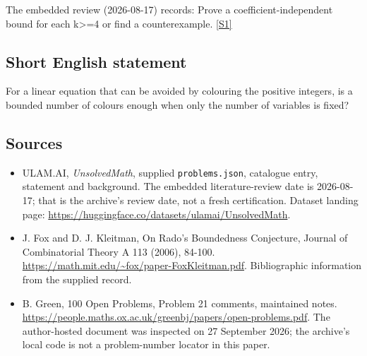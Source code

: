 \documentclass[11pt,a4paper]{article}
\newcommand{\sref}[2]{\hyperlink{source:#1:#2}{[S#2]}}
\begin{document}
The embedded review (2026-08-17) records: Prove a coefficient-independent bound for each k>=4 or find a counterexample. \sref{statement}{1}

\subsection{Short English statement}

For a linear equation that can be avoided by colouring the positive integers, is a bounded number of colours enough when only the number of variables is fixed?

\subsection{Sources}

{\small

\begin{itemize}

\item[\hypertarget{source:statement:1}{S1}] ULAM.AI, \emph{UnsolvedMath}, supplied \texttt{problems.json}, catalogue entry, statement and background. The embedded literature-review date is 2026-08-17; that is the archive’s review date, not a fresh certification. Dataset landing page: \url{https://huggingface.co/datasets/ulamai/UnsolvedMath}.

\item[\hypertarget{source:statement:2}{S2}] J. Fox and D. J. Kleitman, On Rado's Boundedness Conjecture, Journal of Combinatorial Theory A 113 (2006), 84-100. \url{https://math.mit.edu/~fox/paper-FoxKleitman.pdf}. Bibliographic information from the supplied record.

\item[\hypertarget{source:statement:3}{S3}] B. Green, 100 Open Problems, Problem 21 comments, maintained notes. \url{https://people.maths.ox.ac.uk/greenbj/papers/open-problems.pdf}. The author-hosted document was inspected on 27 September 2026; the archive’s local code is not a problem-number locator in this paper.

\end{itemize}

}

\label{end:statement}
\end{document}
